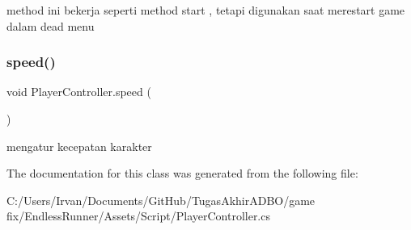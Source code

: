 method ini bekerja seperti method start , tetapi digunakan saat merestart game dalam dead menu 

\hypertarget{class_player_controller_accbeb6b75b9f6067679b960a91581de6}{}\label{class_player_controller_accbeb6b75b9f6067679b960a91581de6} 
\subsubsection{\texorpdfstring{speed()}{speed()}}
{\footnotesize\ttfamily void Player\+Controller.\+speed (\begin{DoxyParamCaption}{ }\end{DoxyParamCaption})\hspace{0.3cm}{\ttfamily [private]}}



mengatur kecepatan karakter 



The documentation for this class was generated from the following file\+:\begin{DoxyCompactItemize}
\item 
C\+:/\+Users/\+Irvan/\+Documents/\+Git\+Hub/\+Tugas\+Akhir\+A\+D\+B\+O/game fix/\+Endless\+Runner/\+Assets/\+Script/Player\+Controller.\+cs\end{DoxyCompactItemize}
